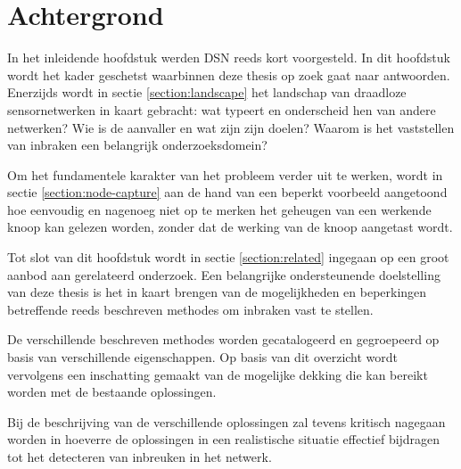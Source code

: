 
\chapter{Achtergrond}
\label{chapter:achtergrond}

In het inleidende hoofdstuk werden DSN reeds kort voorgesteld. In dit hoofdstuk
wordt het kader geschetst waarbinnen deze thesis op zoek gaat naar antwoorden.
Enerzijds wordt in sectie \ref{section:landscape} het landschap van draadloze
sensornetwerken in kaart gebracht: wat typeert en onderscheid hen van andere
netwerken? Wie is de aanvaller en wat zijn zijn doelen? Waarom is het
vaststellen van inbraken een belangrijk onderzoeksdomein?

Om het fundamentele karakter van het probleem verder uit te werken, wordt in
sectie \ref{section:node-capture} aan de hand van een beperkt voorbeeld
aangetoond hoe eenvoudig en nagenoeg niet op te merken het geheugen van een
werkende knoop kan gelezen worden, zonder dat de werking van de knoop aangetast
wordt.

Tot slot van dit hoofdstuk wordt in sectie \ref{section:related} ingegaan op
een groot aanbod aan gerelateerd onderzoek. Een belangrijke ondersteunende
doelstelling van deze thesis is het in kaart brengen van de mogelijkheden en
beperkingen betreffende reeds beschreven methodes om inbraken vast te stellen.

De verschillende beschreven methodes worden gecatalogeerd en gegroepeerd op
basis van verschillende eigenschappen. Op basis van dit overzicht wordt
vervolgens een inschatting gemaakt van de mogelijke dekking die kan bereikt
worden met de bestaande oplossingen.

Bij de beschrijving van de verschillende oplossingen zal tevens kritisch
nagegaan worden in hoeverre de oplossingen in een realistische situatie
effectief bijdragen tot het detecteren van inbreuken in het netwerk.






